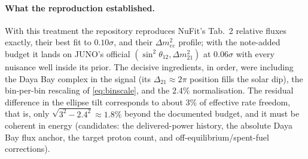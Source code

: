 \documentclass[aps,prd,superscriptaddress,nofootinbib,longbibliography,notitlepage,11pt]{revtex4-2}
\newcommand{\dmee}{\Delta m^2_{ee}}
\newcommand{\dm}[1]{\Delta m^2_{#1}}
\begin{document}
\paragraph{What the reproduction established.}
With this treatment the repository reproduces NuFit's Tab.~2 relative fluxes exactly, their
best fit to $0.10\sigma$, and their $\dmee$ profile; with the note-added budget it lands on
JUNO's official $(\sin^2\theta_{12},\dm{21})$ at $0.06\sigma$ with every nuisance well
inside its prior.  The decisive ingredients, in order, were including the Daya Bay complex
in the signal (its $\Delta_{21}\approx2\pi$ position fills the solar dip), the bin-per-bin
rescaling of \cref{eq:binscale}, and the $2.4\%$ normalisation.  The residual difference in
the ellipse tilt corresponds to about $3\%$ of effective rate freedom, that is, only
$\sqrt{3^2-2.4^2}\approx1.8\%$ beyond the documented budget, and it must be coherent in
energy (candidates: the delivered-power history, the absolute Daya Bay flux anchor, the
target proton count, and off-equilibrium/spent-fuel corrections).



\end{document}
